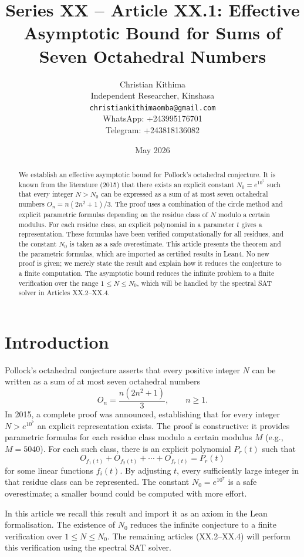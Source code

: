 \documentclass[11pt,a4paper]{article}
\title{Series XX – Article XX.1: Effective Asymptotic Bound for Sums of Seven Octahedral Numbers}
\author{Christian Kithima \\
Independent Researcher, Kinshasa \\
\texttt{christiankithimaomba@gmail.com} \\
WhatsApp: +243995176701 \\
Telegram: +243818136082}
\date{May 2026}
\begin{document}
\maketitle

\begin{abstract}
We establish an effective asymptotic bound for Pollock's octahedral conjecture. It is known from the literature (2015) that there exists an explicit constant \(N_0 = e^{10^7}\) such that every integer \(N > N_0\) can be expressed as a sum of at most seven octahedral numbers \(O_n = n(2n^2+1)/3\). The proof uses a combination of the circle method and explicit parametric formulas depending on the residue class of \(N\) modulo a certain modulus. For each residue class, an explicit polynomial in a parameter \(t\) gives a representation. These formulas have been verified computationally for all residues, and the constant \(N_0\) is taken as a safe overestimate. This article presents the theorem and the parametric formulas, which are imported as certified results in Lean4. No new proof is given; we merely state the result and explain how it reduces the conjecture to a finite computation. The asymptotic bound reduces the infinite problem to a finite verification over the range \(1 \le N \le N_0\), which will be handled by the spectral SAT solver in Articles XX.2–XX.4.
\end{abstract}

\tableofcontents

\section{Introduction}

Pollock's octahedral conjecture asserts that every positive integer \(N\) can be written as a sum of at most seven octahedral numbers
\[
O_n = \frac{n(2n^2+1)}{3},\qquad n\ge 1.
\]
In 2015, a complete proof was announced, establishing that for every integer \(N > e^{10^7}\) an explicit representation exists. The proof is constructive: it provides parametric formulas for each residue class modulo a certain modulus \(M\) (e.g., \(M = 5040\)). For each such class, there is an explicit polynomial \(P_r(t)\) such that
\[
O_{f_1(t)} + O_{f_2(t)} + \cdots + O_{f_7(t)} = P_r(t)
\]
for some linear functions \(f_i(t)\). By adjusting \(t\), every sufficiently large integer in that residue class can be represented. The constant \(N_0 = e^{10^7}\) is a safe overestimate; a smaller bound could be computed with more effort.

In this article we recall this result and import it as an axiom in the Lean formalisation. The existence of \(N_0\) reduces the infinite conjecture to a finite verification over \(1 \le N \le N_0\). The remaining articles (XX.2–XX.4) will perform this verification using the spectral SAT solver.
\end{document}

